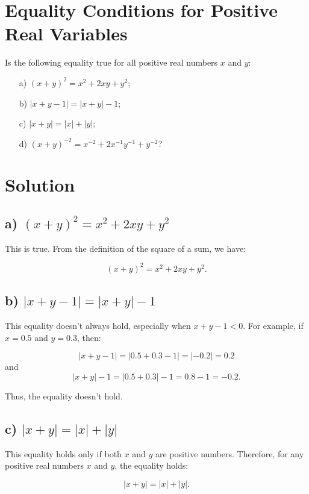 \documentclass{article}
\begin{document}
\section*{Equality Conditions for Positive Real Variables}

Is the following equality true for all positive real numbers $x$ and $y$:
\begin{itemize}
    \item[a)] $(x + y)^2 = x^2 + 2xy + y^2$;
    \item[b)] $|x + y - 1| = |x + y| - 1$;
    \item[c)] $|x + y| = |x| + |y|$;
    \item[d)] $(x + y)^{-2} = x^{-2} + 2x^{-1}y^{-1} + y^{-2}$?
\end{itemize}

\section*{Solution}

\subsection*{a) $(x + y)^2 = x^2 + 2xy + y^2$}

This is true. From the definition of the square of a sum, we have:

\[
(x + y)^2 = x^2 + 2xy + y^2.
\]

\subsection*{b) $|x + y - 1| = |x + y| - 1$}

This equality doesn't always hold, especially when $x + y - 1 < 0$. For example, if $x = 0.5$ and $y = 0.3$, then:

\[
|x + y - 1| = |0.5 + 0.3 - 1| = |-0.2| = 0.2
\]
and
\[
|x + y| - 1 = |0.5 + 0.3| - 1 = 0.8 - 1 = -0.2.
\]

Thus, the equality doesn't hold.

\subsection*{c) $|x + y| = |x| + |y|$}

This equality holds only if both $x$ and $y$ are positive numbers. Therefore, for any positive real numbers $x$ and $y$, the equality holds:

\[
|x + y| = |x| + |y|.
\]
\end{document}
